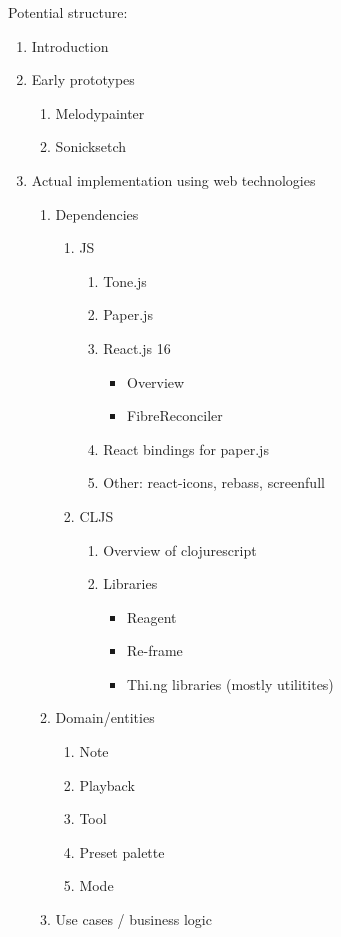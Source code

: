 \documentclass[a4paper,12pt]{article}
\begin{document}
Potential structure:
\begin{enumerate}
\item Introduction
\item Early prototypes
\begin{enumerate}
\item Melodypainter
\item Sonicksetch
\end{enumerate}
\item Actual implementation using web technologies
\begin{enumerate}
\item Dependencies 
\begin{enumerate}
\item JS 
\begin{enumerate}
\item Tone.js
\item Paper.js
\item React.js 16
\begin{itemize}
\item Overview
\item FibreReconciler
\end{itemize}
\item React bindings for paper.js
\item Other: react-icons, rebass, screenfull
\end{enumerate}
\item CLJS
\begin{enumerate}
\item Overview of clojurescript
\item Libraries
\begin{itemize}
\item Reagent
\item Re-frame
\item Thi.ng libraries (mostly utilitites)
\end{itemize}
\end{enumerate}
\end{enumerate}
\item Domain/entities
\begin{enumerate}
\item Note
\item Playback
\item Tool
\item Preset palette
\item Mode
\end{enumerate}
\item Use cases / business logic
\begin{enumerate}

\end{enumerate}
\end{enumerate}
\end{enumerate}
\end{document}
